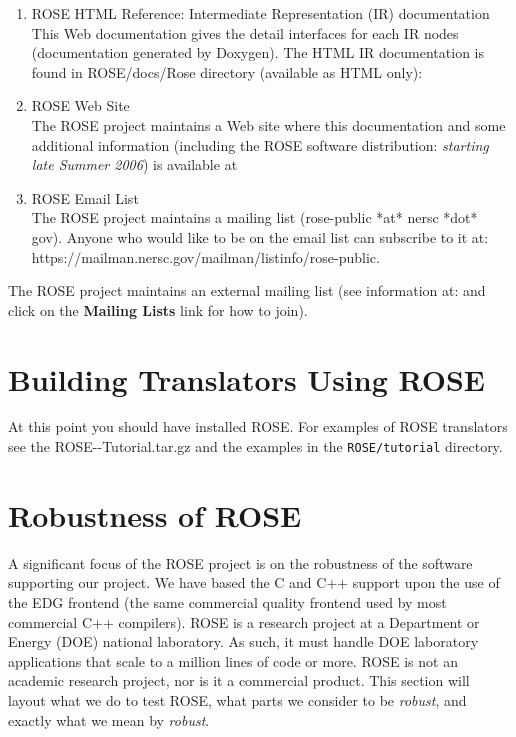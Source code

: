 {\begin{enumerate}
     \item ROSE HTML Reference: Intermediate Representation (IR) documentation \\
           This Web documentation gives the detail interfaces for each IR nodes
           (documentation generated by Doxygen).
           The HTML IR documentation is found in ROSE/docs/Rose directory 
           (available as HTML only): \\
     \item ROSE Web Site \\
           The ROSE project maintains a Web site where this documentation and some
           additional information (including the ROSE software distribution:
           {\em starting late Summer 2006}) is available at
     \item ROSE Email List \\
           The ROSE project maintains a mailing list (rose-public *at* nersc *dot* gov).
           Anyone who would like to be on the email list can subscribe to
           it at:
                {https://mailman.nersc.gov/mailman/listinfo/rose-public}.
\end{enumerate}
}

The ROSE project maintains an external mailing list (see information at:
 and click on the
{\bf Mailing Lists} link for how to join).




\section{Building Translators Using ROSE}

   At this point you should have installed ROSE. For examples of ROSE translators
see the ROSE-\VersionNumber-Tutorial.tar.gz and the examples in the {\tt ROSE/tutorial} 
directory.

\section{Robustness of ROSE}
    A significant focus of the ROSE project is on the robustness of
the software supporting our project.  We have based the C and C++ support
upon the use of the EDG frontend (the same commercial quality frontend used by most
commercial C++ compilers). ROSE is a research project at a Department or Energy (DOE)
national laboratory.  As such, it must handle DOE laboratory applications that
scale to a million lines of code or more.  ROSE is not an academic research
project, nor is it a commercial product.  This section will layout what we do to test 
ROSE, what parts we consider to be {\em robust}, and exactly what we mean by 
{\em robust}.

